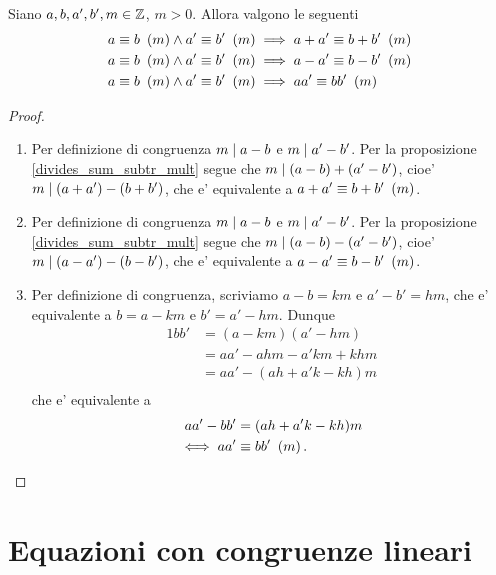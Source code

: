 \begin{proposition}
    Siano $a, b, a', b', m \in \mathbb{Z}$, $m > 0$. Allora valgono le seguenti
    \begin{align}
        &a \equiv b \ \left(m\right)\land a' \equiv b' \ \left(m\right)\implies a+a' \equiv b+b'\ \left(m\right) \label{somma_congrui}\\
        &a \equiv b \ \left(m\right)\land a' \equiv b' \ \left(m\right)\implies a-a' \equiv b-b'\ \left(m\right) \label{differenza_congrui}\\
        &a \equiv b \ \left(m\right)\land a' \equiv b' \ \left(m\right)\implies aa' \equiv bb'\ \left(m\right) \label{prodotto_congrui}
    \end{align}
\end{proposition}
\begin{proof}
    \begin{enumerate}
        \item Per definizione di congruenza $m \mid a - b$ e $m \mid a' - b'$. Per la proposizione \ref{divides_sum_subtr_mult} segue che $m \mid (a - b) + (a' - b')$, cioe' $m \mid (a + a') - (b + b')$, che e' equivalente a $a+a' \equiv b+b'\ \left(m\right)$.
        \item Per definizione di congruenza $m \mid a - b$ e $m \mid a' - b'$. Per la proposizione \ref{divides_sum_subtr_mult} segue che $m \mid (a - b) - (a' - b')$, cioe' $m \mid (a - a') - (b - b')$, che e' equivalente a $a-a' \equiv b-b'\ \left(m\right)$.
        \item Per definizione di congruenza, scriviamo $a - b = km$ e $a' - b' = hm$, che e' equivalente a $b = a - km$ e $b' = a' - hm$. Dunque
        \begin{alignat*}
            {1}
            bb' &= (a - km)(a' - hm) \\
                &= aa' - ahm - a'km + khm \\
                &= aa' - (ah + a'k - kh)m \\
        \end{alignat*}    
        che e' equivalente a
        \begin{alignat*} {1}
            aa' - bb' &= (ah + a'k - kh)m \\
            \iff aa' &\equiv bb' \ \left(m\right).
        \end{alignat*}
        
    \end{enumerate}
    
\end{proof}

\section{Equazioni con congruenze lineari}

